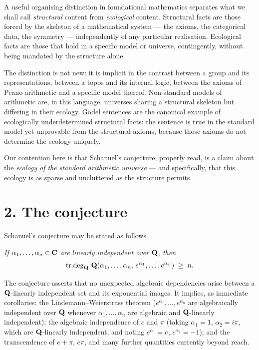 A useful organising distinction in foundational mathematics separates what we
shall call {\it structural} content from {\it ecological} content. Structural
facts are those forced by the skeleton of a mathematical system --- the axioms,
the categorical data, the symmetry --- independently of any particular
realisation. Ecological facts are those that hold in a specific model or
universe, contingently, without being mandated by the structure alone.

The distinction is not new: it is implicit in the contrast between a group and
its representations, between a topos and its internal logic, between the axioms
of Peano arithmetic and a specific model thereof. Non-standard models of
arithmetic are, in this language, universes sharing a structural skeleton but
differing in their ecology. G\"odel sentences are the canonical example of
ecologically underdetermined structural facts: the sentence is true in the
standard model yet unprovable from the structural axioms, because those axioms
do not determine the ecology uniquely.

Our contention here is that Schanuel's conjecture, properly read, is a claim
about the {\it ecology of the standard arithmetic universe} --- and specifically,
that this ecology is as sparse and uncluttered as the structure permits.

\section{2. The conjecture}

Schanuel's conjecture may be stated as follows.

\medskip
{} {\it If $\alpha_1, \ldots,
\alpha_n \in {\bf C}$ are linearly independent over ${\bf Q}$, then
$$\mathop{\rm tr.deg}\nolimits_{\bf Q}\,{\bf Q}(\alpha_1, \ldots, \alpha_n,\, e^{\alpha_1}, \ldots, e^{\alpha_n})
\;\geq\; n.$$}

\medskip\noindent
The conjecture asserts that no unexpected algebraic dependencies arise between
a ${\bf Q}$-linearly independent set and its exponential images. It implies, as
immediate corollaries: the Lindemann--Weierstrass theorem ($e^{\alpha_1},
\ldots, e^{\alpha_n}$ are algebraically independent over ${\bf Q}$ whenever
$\alpha_1, \ldots, \alpha_n$ are algebraic and ${\bf Q}$-linearly independent); the
algebraic independence of $e$ and $\pi$ (taking $\alpha_1 = 1$,
$\alpha_2 = i\pi$, which are ${\bf Q}$-linearly independent, and noting
$e^{\alpha_1} = e$, $e^{\alpha_2} = -1$); and the transcendence of $e + \pi$,
$e\pi$, and many further quantities currently beyond reach.

